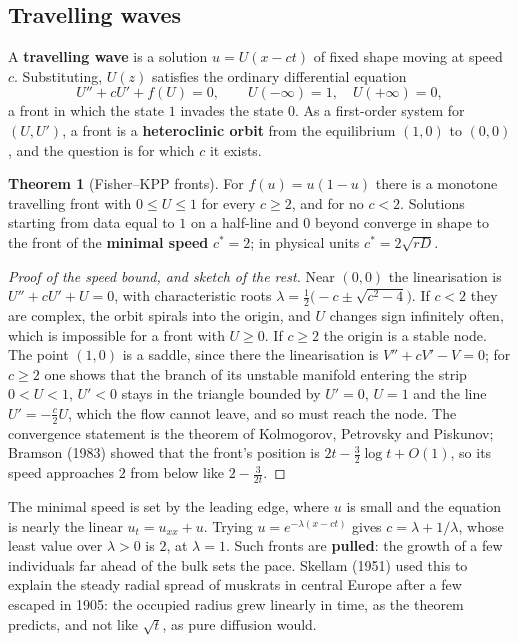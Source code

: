 \documentclass[11pt,a4paper]{article}
\numberwithin{equation}{section}
\theoremstyle{definition}
\newtheorem{thm}{Theorem}[subsection]
\begin{document}
\subsection{Travelling waves}
\label{ssec:travelling}

A \textbf{travelling wave} is a solution $u = U(x - ct)$ of fixed shape moving at speed $c$. Substituting, $U(z)$ satisfies the ordinary differential equation
\[
U'' + cU' + f(U) = 0, \qquad U(-\infty) = 1, \quad U(+\infty) = 0 ,
\]
a front in which the state $1$ invades the state $0$. As a first-order system for $(U, U')$, a front is a \textbf{heteroclinic orbit} from the equilibrium $(1, 0)$ to $(0, 0)$, and the question is for which $c$ it exists.

\begin{thm}[Fisher--KPP fronts]
\label{thm:kpp}
For $f(u) = u(1 - u)$ there is a monotone travelling front with $0 \leq U \leq 1$ for every $c \geq 2$, and for no $c < 2$. Solutions starting from data equal to $1$ on a half-line and $0$ beyond converge in shape to the front of the \textbf{minimal speed} $c^* = 2$; in physical units $c^* = 2\sqrt{rD}$.
\end{thm}

\begin{proof}[Proof of the speed bound, and sketch of the rest]
Near $(0, 0)$ the linearisation is $U'' + cU' + U = 0$, with characteristic roots $\lambda = \frac12\bigl(-c \pm \sqrt{c^2 - 4}\bigr)$. If $c < 2$ they are complex, the orbit spirals into the origin, and $U$ changes sign infinitely often, which is impossible for a front with $U \geq 0$. If $c \geq 2$ the origin is a stable node. The point
$(1, 0)$ is a saddle, since there the linearisation is $V'' + cV' - V = 0$; for $c \geq 2$ one shows that the branch of its unstable manifold entering the strip $0 < U < 1$, $U' < 0$ stays in the triangle bounded by $U' = 0$, $U = 1$ and the line $U' = -\frac c2U$, which the flow cannot leave, and so must
reach the node. The convergence statement is the theorem of Kolmogorov, Petrovsky and Piskunov; Bramson (1983) showed that the front's position is $2t - \frac32\log t + O(1)$, so its speed approaches $2$ from below like $2 - \frac3{2t}$.
\end{proof}

The minimal speed is set by the leading edge, where $u$ is small and the equation is nearly the linear $u_t = u_{xx} + u$. Trying $u = e^{-\lambda(x - ct)}$ gives $c = \lambda + 1/\lambda$, whose least value over $\lambda > 0$ is $2$, at $\lambda = 1$. Such fronts are \textbf{pulled}: the growth of a few individuals far ahead
of the bulk sets the pace. Skellam (1951) used this to explain the steady radial spread of muskrats in central Europe after a few escaped in 1905: the occupied radius grew linearly in time, as the theorem predicts, and not like $\sqrt t$, as pure diffusion would.
\end{document}
